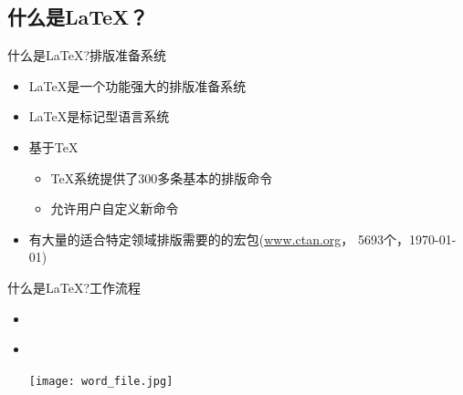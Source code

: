\documentclass[fontset = adobe, xcolor=svgnames, t, aspectratio=169]{ctexbeamer}
\begin{document}
\subsection[是什么？]{什么是\LaTeX ？}\label{sec01-02}
\begin{frame}[t]{什么是\LaTeX?}{排版准备系统}
  \stretchon
  \begin{itemize}
  \item \LaTeX{}是一个功能强大的排版准备系统
  \item \LaTeX{}是标记型语言系统
  \item 基于\TeX
    \begin{itemize}
    \item \TeX{}系统提供了300多条基本的排版命令
    \item 允许用户自定义新命令
    \end{itemize}
  \item 有大量的适合特定领域排版需要的的宏包(\url{www.ctan.org}，
    \alert{5693}个，\today )
  \end{itemize}
  \stretchoff
\end{frame}

\begin{frame}[t]{什么是\LaTeX?}{工作流程}
  \begin{itemize}
  \item \wysiwym\\[4ex]
    \begin{center}
    \end{center}
    \vspace{4ex}
  \item \wysiwyg\\[4ex]
    \begin{center}
      \texttt{[image: word\_file.jpg]}
    \end{center}
  \end{itemize}
\end{frame}
\end{document}
